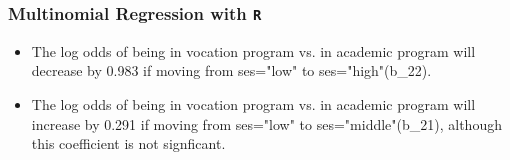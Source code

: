 \documentclass[00-GLMregslides.tex]{subfiles}
\begin{document}
\begin{frame}[fragile]
	
	\frametitle{Multinomial Regression with \texttt{R}}
	\Large
	\begin{itemize}
\item The log odds of being in vocation program vs. in academic program will decrease by 0.983 if moving from ses="low" to ses="high"(b\_22).
\item The log odds of being in vocation program vs. in academic program will increase by 0.291 if moving from ses="low" to ses="middle"(b\_21), although this coefficient is not signficant.
\end{itemize}
\end{frame}
\end{document}
